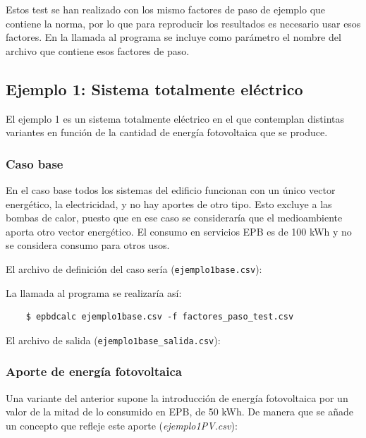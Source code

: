 \documentclass[10pt,notitlepage,oneside,a4paper]{article}
\begin{document}
Estos test se han realizado con los mismo factores de paso de ejemplo que contiene la norma, por lo que para reproducir los resultados es necesario usar esos factores. En la llamada al programa se incluye como parámetro el nombre del archivo que contiene esos factores de paso.

\subsection{Ejemplo 1: Sistema totalmente eléctrico}
El ejemplo 1 es un sistema totalmente eléctrico en el que contemplan distintas variantes en función de la cantidad de energía fotovoltaica que se produce.


\subsubsection{Caso base}
 
En el caso base todos los sistemas del edificio funcionan con un único vector energético, la electricidad, y no hay aportes de otro tipo. Esto excluye a las bombas de calor, puesto que en ese caso se consideraría que el medioambiente aporta otro vector energético. El consumo en servicios EPB es de 100 kWh y no se considera consumo para otros usos.

El archivo de definición del caso sería (\texttt{ejemplo1base.csv}):


La llamada al programa se realizaría así:

\begin{verbatim}
    $ epbdcalc ejemplo1base.csv -f factores_paso_test.csv
\end{verbatim}

El archivo de salida (\texttt{ejemplo1base\_salida.csv}):


\subsubsection{Aporte de energía fotovoltaica}

Una variante del anterior supone la introducción de energía fotovoltaica por un valor de la mitad de lo consumido en EPB, de 50 kWh. De manera que se añade un concepto que refleje este aporte (\textit{ejemplo1PV.csv}):
\end{document}
